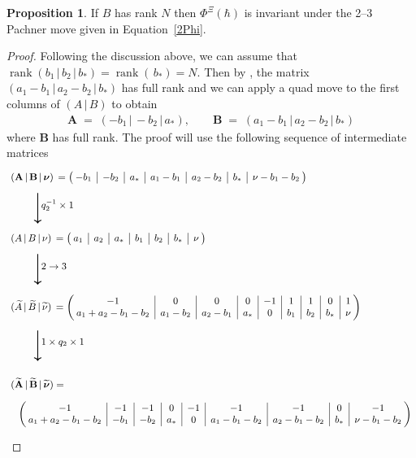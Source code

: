 \documentclass[12pt,reqno]{amsart}
\theoremstyle{definition}
\newtheorem{proposition}[theorem]{Proposition}
\def\be{\begin{equation}}
\def\ee{\end{equation}}
\newcommand{\bea}{\begin{equation}\begin{aligned}}
\newcommand{\eea}{\end{aligned}\end{equation}}
\renewcommand{\=}{\;=\;}
\begin{document}
\begin{proposition}
\label{prop.case2}
If $B$ has rank $N$ then $\Phi^{\Xi}(\hbar)$ is invariant under the 2--3
Pachner move given in Equation~\eqref{2Phi}.
\end{proposition}

\begin{proof}

Following the discussion above, we can assume that
$\operatorname{rank}(b_1\,|\,b_2\,|\,b_*) = \operatorname{rank}(\,b_*) = N$.
Then by \cite[Lem.A.3]{DG}, the matrix $(a_1-b_1\,|\,a_2-b_2\,|\,b_*)$ has full rank
and we can apply a quad move to the first columns of $(A\,|\,B)$ to obtain
\bea
\mathbf A \= 
(-b_1 \,|\, -b_2 \,|\, a_*),\qquad
\mathbf B \= (a_1-b_1 \,|\, a_2-b_2 \,|\, b_*)
\eea
where $\mathbf B$ has full rank. The proof will use the following sequence
of intermediate matrices
\be
\label{manyAB.c2}
\begin{small}
\begin{tikzpicture}[baseline=(current  bounding  box.center)]
\node[right] at (0,0) {$(\mathbf A\,|\, \mathbf B\,|\,\boldsymbol{\nu}) \,=
\left(\!\!\begin{array}{c|c|c|c|c|c|c}
-b_1 & -b_2 & a_* & a_1-b_1 & a_2-b_2 & b_* & \nu-b_1-b_2
\end{array}\!\!\right)$};

\node[right] at (1,-0.9) {$q_2^{-1}\times 1$};
\draw[->,thick] (1,-0.5)--(1,-1.5);

\node[right] at (0,-2) {$(A\,|\,B\,|\,\nu) \,= \left(\!\!\begin{array}{c|c|c|c|c|c|c}
a_1 & a_2 & a_* & b_1 & b_2 & b_* &\nu
\end{array}\!\!\right)$};

\node[right] at (1,-2.9) {$2\to 3$};
\draw[->,thick] (1,-2.5)--(1,-3.5);

\node[right] at (0,-4.25) {$(\widetilde A\,|\,\widetilde B\,|\,\widetilde{\nu}) \,=
\left(\!\!\begin{array}{c|c|c|c|c|c|c|c|c}
-1 & 0 & 0 & 0 & -1 & 1 & 1 & 0 & 1\\
a_1+a_2-b_1-b_2 & a_1-b_2 & a_2-b_1 & a_*&
0 & b_1 & b_2 & b_* & \nu
\end{array}\!\!\right)$};

\node[right] at (1,-5.4) {$1\times q_2\times 1$};
\draw[->,thick] (1,-5)--(1,-6);

\node[right] at (0,-6.75) {$(\widetilde {\mathbf A}\,|\,\widetilde
{\mathbf B}\,|\,\widetilde{\boldsymbol{\nu}})=$};

\node[right] at (0.25,-7.75)
{$\left(\!\!\begin{array}{c|c|c|c|c|c|c|c|c}
-1 & -1 & -1 & 0 & -1 & -1 & -1 & 0 & -1\\
a_1+a_2-b_1-b_2 & -b_1 & -b_2 & a_*&
0 & a_1-b_1-b_2 & a_2-b_1-b_2 & b_* & \nu - b_1-b_2
\end{array}\!\!\right)$};
\end{tikzpicture}
\end{small}
\ee


\end{proof}
\end{document}
